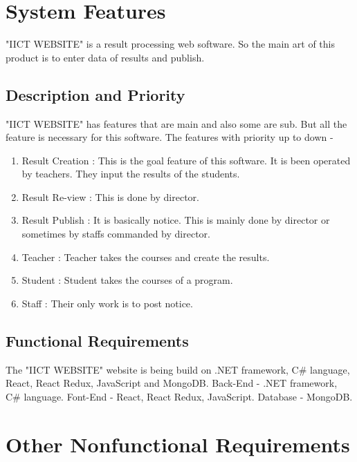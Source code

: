 \documentclass{scrreprt}
\begin{document}
    \chapter{System Features}
    "IICT WEBSITE" is a result processing web software. So the main art of this product is to enter data of results and publish.

    \section{Description and Priority}
    "IICT WEBSITE" has features that are main and also some are sub. But all the feature is necessary for this software.
    \newline
    The features with priority up to down -
    \begin{enumerate}
        \item Result Creation : This is the goal feature of this software. It is been operated by teachers. They input the results of the students.
        \item Result Re-view : This is done by director.
        \item Result Publish : It is basically notice. This is mainly done by director or sometimes by staffs commanded by director.
        \item Teacher : Teacher takes the courses and create the results.
        \item Student : Student takes the courses of a program.
        \item Staff : Their only work is to post notice.
    \end{enumerate}

    \section{Functional Requirements}
    The "IICT WEBSITE" website is being build on .NET framework, C\# language, React, React Redux, JavaScript and MongoDB.
    \newline
    Back-End - .NET framework, C\# language.
    \newline
    Font-End - React, React Redux, JavaScript.
    \newline
    Database -  MongoDB.


    \chapter{Other Nonfunctional Requirements}
\end{document}

